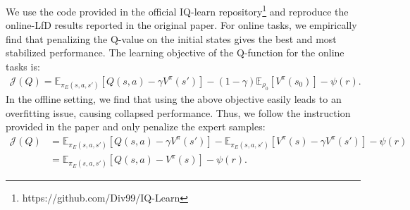 We use the code provided in the official IQ-learn repository\footnote{https://github.com/Div99/IQ-Learn} and reproduce the online-LfD results reported in the original paper. For online tasks, we empirically find that penalizing the Q-value on the initial states gives the best and most stabilized performance. The learning objective of the Q-function for the online tasks is:
\begin{align}
\mathcal{J}(Q)= \mathbb{E}_{\pi_E(s,a,s')}\left[Q(s,a)- \gamma V^{\pi}(s') \right] 
- (1-\gamma)\mathbb{E}_{\rho_0}\left[V^{\pi}(s_0) \right] \nonumber
-\psi(r).
\end{align}
In the offline setting, we find that using the above objective easily leads to an overfitting issue, causing collapsed performance. Thus, we follow the instruction provided in the paper and only penalize the expert samples: 
\begin{align}
\mathcal{J}(Q) &= \mathbb{E}_{\pi_E(s,a,s')}\left[Q(s,a)- \gamma V^{\pi}(s') \right] 
- \mathbb{E}_{\pi_E(s,a,s')}\left[V^{\pi}(s)- \gamma V^{\pi}(s')\right]
-\psi(r) \nonumber \\
&= \mathbb{E}_{\pi_E(s,a,s')}\left[Q(s,a)-V^{\pi}(s)\right]
-\psi(r) . \nonumber
\end{align}


